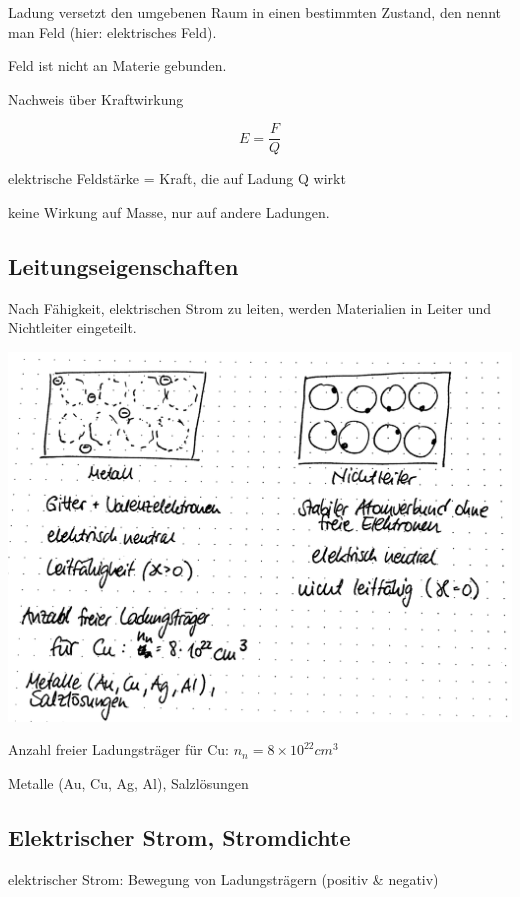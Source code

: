 \documentclass[10pt, a4paper]{article}
\begin{document}
Ladung versetzt den umgebenen Raum in einen bestimmten Zustand, den nennt man Feld (hier: elektrisches Feld).

Feld ist nicht an Materie gebunden.

Nachweis über Kraftwirkung

$$E = \frac{F}{Q}$$

elektrische Feldstärke = Kraft, die auf Ladung Q wirkt

keine Wirkung auf Masse, nur auf andere Ladungen.

\subsection{Leitungseigenschaften}

Nach Fähigkeit, elektrischen Strom zu leiten, werden Materialien in Leiter und Nichtleiter eingeteilt.

\includegraphics[width=\textwidth]{img/5}

Anzahl freier Ladungsträger für Cu: $n_n = 8 \times 10^{22}cm^3$

Metalle (Au, Cu, Ag, Al), Salzlösungen

\subsection{Elektrischer Strom, Stromdichte}

elektrischer Strom: Bewegung von Ladungsträgern (positiv \& negativ)
\end{document}
